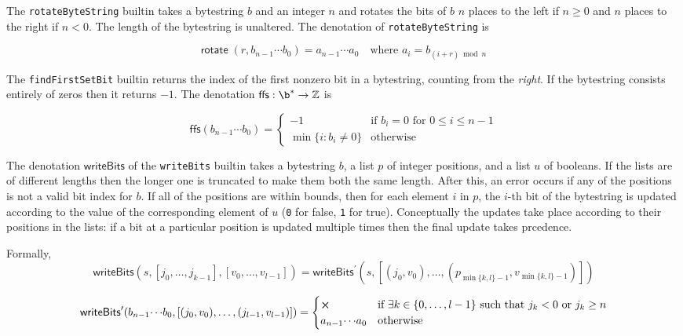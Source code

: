 \label{note:rotate}
The \texttt{rotateByteString} builtin takes a bytestring $b$ and an integer $n$ and
rotates the bits of $b$ $n$ places to the left if $n \geq 0$ and $n$ places to
the right if $n < 0$.  The length of the bytestring is unaltered.  The denotation of
\texttt{rotateByteString} is 

$$
\mathsf{rotate}\;(r, b_{n-1} \cdots b_0) = a_{n-1}\cdots a_0 \quad\text{where $a_i = b_{(i+r)\bmod n}$}
$$

\label{note:ffs}

The \texttt{findFirstSetBit} builtin returns the index of the first nonzero bit
in a bytestring, counting from the \textit{right}. If the bytestring consists
entirely of zeros then it returns $-1$.  The denotation
$\mathsf{ffs}: \b^* \rightarrow \Z$ is

$$
\mathsf{ffs}(b_{n-1}\cdots b_0) =
\begin{cases}
  -1 & \text{if $b_i = 0$ for $0 \leq i \leq n-1$}\\
  \min{\{i: b_i \ne 0\}} & \text{otherwise}
  \end{cases}
$$


\label{note:writebits}

The denotation $\mathsf{writeBits}$ of the \texttt{writeBits} builtin takes a
bytestring $b$, a list $p$ of integer positions, and a list $u$ of booleans.  If
the lists are of different lengths then the longer one is truncated to make them
both the same length.  After this, an error occurs if any of the positions is
not a valid bit index for $b$.  If all of the positions are within bounds, then
for each element $i$ in $p$, the $i$-th bit of the bytestring is updated
according to the value of the corresponding element of $u$ (\texttt{0}
for \textsf{false}, \texttt{1} for \textsf{true}).  Conceptually the updates
take place according to their positions in the lists: if a bit at a particular
position is updated multiple times then the final update takes prcedence.

\smallskip
\noindent Formally, 
$$
\mathsf{writeBits}(s, [j_0 , \ldots, j_{k-1}], [v_0, \ldots, v_{l-1}]) =
    \mathsf{writeBits}^{\prime} (s, [(j_0, v_0) , \ldots, (p_{\min\{k,l\}-1}, v_{\min\{k,l\}-1})])
$$

$$
\mathsf{writeBits}^{\prime}(b_{n-1}{\cdots}b_0, [(j_0,v_0), \ldots, (j_{l-1}, v_{l-1})]) = 
\begin{cases}
\errorX & \text{if $\exists k \in \{0, \ldots, l-1\}$ such that $j_k<0$ or $j_k \geq n$} \\
a_{n-1}{\cdots}a_0 & \text{otherwise}
\end{cases}
$$

